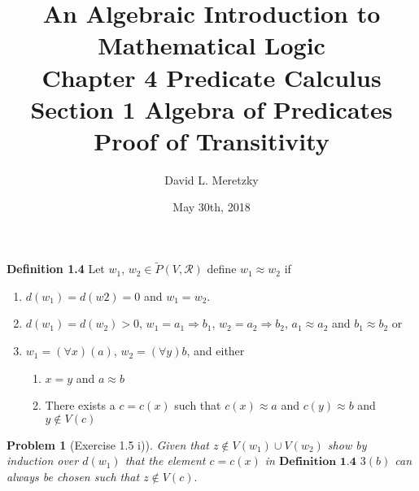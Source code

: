\documentclass{article}
\title{ \vspace{-10ex} %
An Algebraic Introduction to Mathematical Logic\\
Chapter 4 Predicate Calculus \\
Section 1 Algebra of Predicates \\
Proof of Transitivity 
}
\author{David L. Meretzky
}
\date{%
May 30th, 2018
}
\theoremstyle{problemstyle}
\newtheorem{problem}{Problem}
\theoremstyle{lemmastyle}
\theoremstyle{theoremstyle}
\begin{document}
\maketitle

\begin{flushleft}
\textbf{Definition 1.4} Let $w_1$, $w_2 \in \widetilde{P}(V,\mathscr{R})$ define $w_1 \approx w_2$ if

\begin{enumerate}
\item $d(w_1) = d(w2) = 0$ and $w_1 = w_2$. 
\item $d(w_1) = d(w_2) > 0$, $w_1 = a_1 \Rightarrow b_1$, $w_2 = a_2 \Rightarrow b_2$, $a_1 \approx a_2$ and $b_1 \approx b_2$ or 
\item $w_1 = (\forall x)(a)$, $w_2 = (\forall y)b$, and either
\begin{enumerate}
\item $x = y$ and $a \approx b$   
\item There exists a $c = c(x)$ such that $c(x) \approx a$ and $c(y) \approx b$ and $y \notin V(c)$ 
\end{enumerate}
\end{enumerate}
\end{flushleft}


\begin{problem}[Exercise 1.5 i)]
Given that $z \notin V(w_1) \cup V(w_2)$ show by induction over $d(w_1)$ that the element $c = c(x)$ in $\textbf{Definition 1.4}$ $3 (b)$ can always be chosen such that $z \notin V(c).$
\end{problem}
\end{document}
